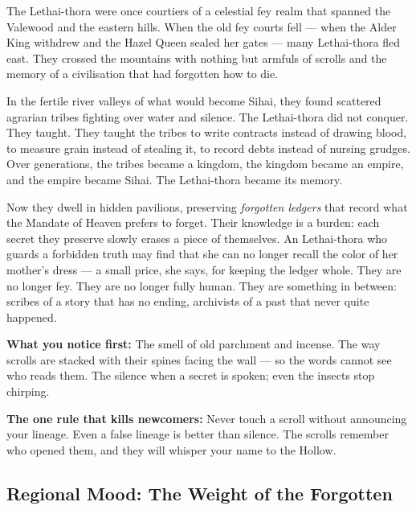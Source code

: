 \vspace{2mm}
\begin{tcolorbox}[colback=black!3,colframe=blue!60!black,title={Theme \& Atmosphere},breakable]
The Lethai-thora were once courtiers of a celestial fey realm that spanned the Valewood and the eastern hills. When the old fey courts fell --- when the Alder King withdrew and the Hazel Queen sealed her gates --- many Lethai-thora fled east. They crossed the mountains with nothing but armfuls of scrolls and the memory of a civilisation that had forgotten how to die.

In the fertile river valleys of what would become Sihai, they found scattered agrarian tribes fighting over water and silence. The Lethai-thora did not conquer. They taught. They taught the tribes to write contracts instead of drawing blood, to measure grain instead of stealing it, to record debts instead of nursing grudges. Over generations, the tribes became a kingdom, the kingdom became an empire, and the empire became Sihai. The Lethai-thora became its memory.

Now they dwell in hidden pavilions, preserving \textit{forgotten ledgers} that record what the Mandate of Heaven prefers to forget. Their knowledge is a burden: each secret they preserve slowly erases a piece of themselves. An Lethai-thora who guards a forbidden truth may find that she can no longer recall the color of her mother's dress --- a small price, she says, for keeping the ledger whole. They are no longer fey. They are no longer fully human. They are something in between: scribes of a story that has no ending, archivists of a past that never quite happened.

\vspace{2mm}
\textbf{What you notice first:} The smell of old parchment and incense. The way scrolls are stacked with their spines facing the wall --- so the words cannot see who reads them. The silence when a secret is spoken; even the insects stop chirping.

\textbf{The one rule that kills newcomers:} Never touch a scroll without announcing your lineage. Even a false lineage is better than silence. The scrolls remember who opened them, and they will whisper your name to the Hollow.
\end{tcolorbox}

\subsection*{Regional Mood: The Weight of the Forgotten}

